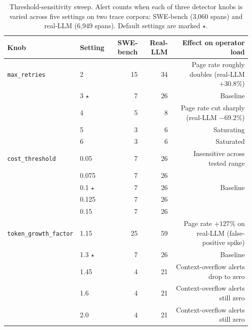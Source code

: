 \documentclass[journal]{IEEEtran}
\begin{document}
\begin{table}[t]
\centering
\caption{Threshold-sensitivity sweep. Alert counts when each of three detector knobs is varied across five settings on two trace corpora: SWE-bench (3{,}060 spans) and real-LLM (6{,}949 spans). Default settings are marked \textbf{$\star$}.}
\label{tab:sensitivity}
\small
\begin{tabular}{@{}llrrr@{}}
\toprule
\textbf{Knob} & \textbf{Setting} & \textbf{SWE-bench} & \textbf{Real-LLM} & \textbf{Effect on operator load} \\
\midrule
\texttt{max\_retries}        & 2          & 15 & 34 & Page rate roughly doubles (real-LLM $+30.8\%$) \\
                             & 3 $\star$ & 7  & 26 & Baseline \\
                             & 4          & 5  & 8  & Page rate cut sharply (real-LLM $-69.2\%$) \\
                             & 5          & 3  & 6  & Saturating \\
                             & 6          & 3  & 6  & Saturated \\
\midrule
\texttt{cost\_threshold}     & 0.05       & 7  & 26 & Insensitive across tested range \\
                             & 0.075      & 7  & 26 & \\
                             & 0.1 $\star$& 7  & 26 & Baseline \\
                             & 0.125      & 7  & 26 & \\
                             & 0.15       & 7  & 26 & \\
\midrule
\texttt{token\_growth\_factor} & 1.15     & 25 & 59 & Page rate $+127\%$ on real-LLM (false-positive spike) \\
                             & 1.3 $\star$ & 7 & 26 & Baseline \\
                             & 1.45       & 4  & 21 & Context-overflow alerts drop to zero \\
                             & 1.6        & 4  & 21 & Context-overflow alerts still zero \\
                             & 2.0        & 4  & 21 & Context-overflow alerts still zero \\
\bottomrule
\end{tabular}
\par\smallskip\noindent

\end{table}
\end{document}

